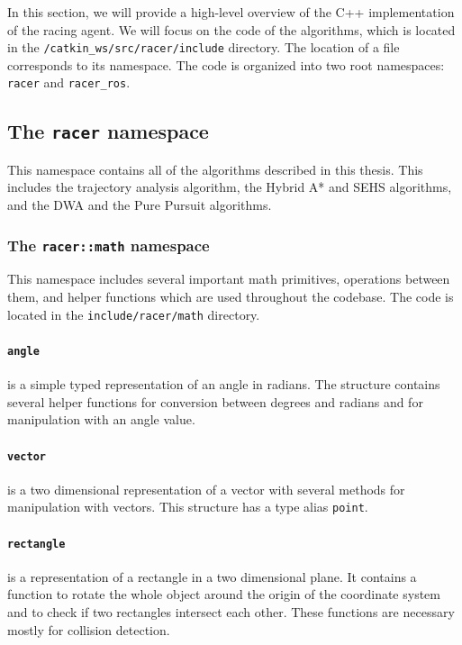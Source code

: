 In this section, we will provide a high-level overview of the C++ implementation of the racing agent. We will focus on the code of the algorithms, which is located in the \texttt{/catkin\_ws/src/racer/include} directory. The location of a file corresponds to its namespace. The code is organized into two root namespaces: \texttt{racer} and \texttt{racer\_ros}.

\subsection{The \texttt{racer} namespace}

This namespace contains all of the algorithms described in this thesis. This includes the trajectory analysis algorithm, the Hybrid A* and \gls*{SEHS} algorithms, and the \gls*{DWA} and the Pure Pursuit algorithms.

\subsubsection{The \texttt{racer::math} namespace}

This namespace includes several important math primitives, operations between them, and helper functions which are used throughout the codebase. The code is located in the \texttt{include/racer/math} directory.

\paragraph{\texttt{angle}} is a simple typed representation of an angle in radians. The structure contains several helper functions for conversion between degrees and radians and for manipulation with an angle value.

\paragraph{\texttt{vector}} is a two dimensional representation of a vector with several methods for manipulation with vectors. This structure has a type alias \texttt{point}.

\paragraph{\texttt{rectangle}} is a representation of a rectangle in a two dimensional plane. It contains a function to rotate the whole object around the origin of the coordinate system and to check if two rectangles intersect each other. These functions are necessary mostly for collision detection.

